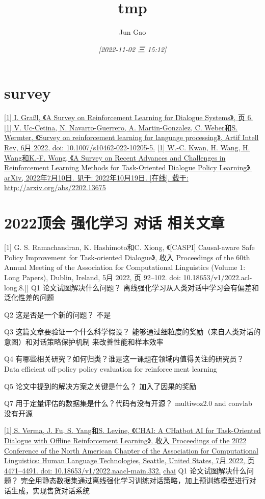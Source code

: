 \documentclass[11pt]{article}
\author{Jun Gao}
\date{\textit{[2022-11-02 三 15:12]}}
\title{tmp}
\begin{document}
\maketitle
\tableofcontents


\section{survey}
\label{sec:orgfd070b6}
\href{//select/items/1\_SA76QZ4Z}{[1] I. Graßl, 《A Survey on Reinforcement Learning for Dialogue Systems》, 页 6.}
\href{//select/items/1\_27FLF3KC}{[1] V. Uc-Cetina, N. Navarro-Guerrero, A. Martin-Gonzalez, C. Weber和S. Wermter, 《Survey on reinforcement learning for language processing》, Artif Intell Rev, 6月 2022, doi: 10.1007/s10462-022-10205-5.}
\href{//select/items/1\_BD3M93QV}{[1] W.-C. Kwan, H. Wang, H. Wang和K.-F. Wong, 《A Survey on Recent Advances and Challenges in Reinforcement Learning Methods for Task-Oriented Dialogue Policy Learning》. arXiv, 2022年7月10日. 见于: 2022年10月19日. [在线]. 载于: http://arxiv.org/abs/2202.13675}

\section{2022顶会 强化学习 对话 相关文章}
\label{sec:orgc2a6c54}
[1] G. S. Ramachandran, K. Hashimoto和C. Xiong, 《[CASPI] Causal-aware Safe Policy Improvement for Task-oriented Dialogue》, 收入 Proceedings of the 60th Annual Meeting of the Association for Computational Linguistics (Volume 1: Long Papers), Dublin, Ireland, 5月 2022, 页 92–102. doi: 10.18653/v1/2022.acl-long.8.]]
Q1 论文试图解决什么问题？
离线强化学习从人类对话中学习会有偏差和泛化性差的问题

Q2 这是否是一个新的问题？
不是

Q3 这篇文章要验证一个什么科学假设？
能够通过细粒度的奖励（来自人类对话的意图）和对话策略保护机制 来改善性能和样本效率

Q4 有哪些相关研究？如何归类？谁是这一课题在领域内值得关注的研究员？
 Dataefficient off-policy policy evaluation for reinforcement learning

Q5 论文中提到的解决方案之关键是什么？
加入了因果的奖励

Q7 用于定量评估的数据集是什么？代码有没有开源？
multiwoz2.0 and convlab
没有开源

\href{//select/items/1\_7DZRRPBZ}{[1] S. Verma, J. Fu, S. Yang和S. Levine, 《CHAI: A CHatbot AI for Task-Oriented Dialogue with Offline Reinforcement Learning》, 收入 Proceedings of the 2022 Conference of the North American Chapter of the Association for Computational Linguistics: Human Language Technologies, Seattle, United States, 7月 2022, 页 4471–4491. doi: 10.18653/v1/2022.naacl-main.332.} \href{20221020105357.org}{chai}
Q1 论文试图解决什么问题？
完全用静态数据集通过离线强化学习训练对话策略，加上预训练模型进行对话生成，实现售货对话系统
\end{document}
